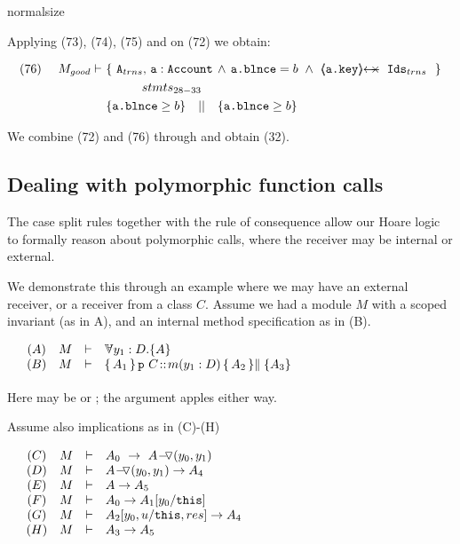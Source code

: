 \begin{proofO}
normalsize

Applying (73), (74), (75) and {} on (72) we obtain:

\small
 \begin{align*}
 \text{(76)}  \ \ \ \ M_{good} \vdash  \ 
		&	\{  \ \Alocalstr, \, \prg{a}:\prg{Account}\, \wedge\,  \prg{a.\balance}=b\ \wedge \ \protectedFrom {\prg{a.key}} {\Idstr}\ \  \} \\
		&  \SPT   stmts_{28-33} \\
		& \{ \prg{a.\balance}\geq b \} \ \ \  || \ \ \  \{ \prg{a.\balance}\geq b \}
\end{align*}
\normalsize

We combine  (72) and (76) through {} and obtain (32).

\end{proofO}

\subsection{Dealing with polymorphic function calls}
\label{app:polymorphic}

The case split rules together with the rule of consequence allow our Hoare logic to formally reason about polymorphic calls, where the receiver may be internal or external.

We demonstrate this through an example where we may have an external receiver, or a receiver from a class $C$. Assume we had a module $M$ with a scoped invariant (as in A), and an internal method specification as in (B). 

$\begin{array}{lclcl}
& (A)& M & \vdash & \TwoStatesN{y_1:D}{A} \\
& (B) & M & \vdash & \mprepostLong {A_1}{ \prg{p}\ C} {m}   {y_1: D} {A_2} { \parallel \{A_3\}}  \\
\\
  \end{array}
$
\\
Here  may be  or ; the argument apples either way.

\vspace{.1cm}

\noindent 
Assume also implications as in (C)-(H)

$\begin{array}{lclcl}
&  (C) & M & \vdash & A_0 \ \rightarrow \ \PushASLong {(y_0,y_1)}{A}\\
&  (D) & M & \vdash &  \PushASLong {(y_0,y_1)}{A} \rightarrow A_4\\
 & (E) &  M & \vdash & A \rightarrow A_5\\
  & (F) &  M & \vdash & A_0 \rightarrow A_1[y_0/\prg{this}]\\
  & (G) &  M & \vdash & A_2[y_0,u/\prg{this},res] \rightarrow A_4 \\
    & (H) &  M & \vdash & A_3  \rightarrow A_5 
\\
  \end{array}
$

